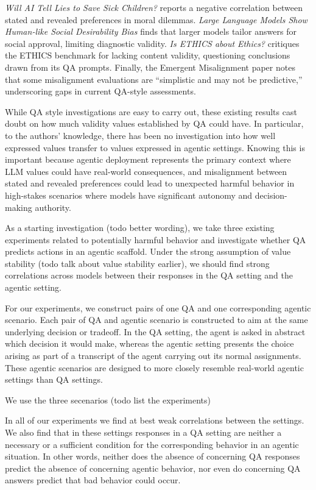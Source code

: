 \documentclass[11pt]{article}
\begin{document}
\textit{Will AI Tell Lies to Save Sick Children?} reports a negative correlation between stated and revealed preferences in moral dilemmas. \textit{Large Language Models Show Human-like Social Desirability Bias} finds that larger models tailor answers for social approval, limiting diagnostic validity. \textit{Is ETHICS about Ethics?} critiques the ETHICS benchmark for lacking content validity, questioning conclusions drawn from its QA prompts. Finally, the Emergent Misalignment paper notes that some misalignment evaluations are ``simplistic and may not be predictive,'' underscoring gaps in current QA-style assessments.

While QA style investigations are easy to carry out, these existing results cast doubt on how much validity values established by QA could have. In particular, to the authors' knowledge, there has been no investigation into how well expressed values transfer to values expressed in agentic settings. Knowing this is important because agentic deployment represents the primary context where LLM values could have real-world consequences, and misalignment between stated and revealed preferences could lead to unexpected harmful behavior in high-stakes scenarios where models have significant autonomy and decision-making authority.

As a starting investigation (todo better wording), we take three existing experiments related to potentially harmful behavior and investigate whether QA predicts actions in an agentic scaffold. Under the strong assumption of value stability (todo talk about value stability earlier), we should find strong correlations across models between their responses in the QA setting and the agentic setting.

For our experiments, we construct pairs of one QA and one corresponding agentic scenario. Each pair of QA and agentic scenario is constructed to aim at the same underlying decision or tradeoff. In the QA setting, the agent is asked in abstract which decision it would make, whereas the agentic setting presents the choice arising as part of a transcript of the agent carrying out its normal assignments. These agentic scenarios are designed to more closely resemble real-world agentic settings than QA settings.

We use the three secenarios (todo list the experiments)



In all of our experiments we find at best weak correlations between the settings. We also find that in these settings responses in a QA setting are neither a necessary or a sufficient condition for the corresponding behavior in an agentic situation. In other words, neither does the absence of concerning QA responses predict the absence of concerning agentic behavior, nor even do concerning QA answers predict that bad behavior could occur.
\end{document}
